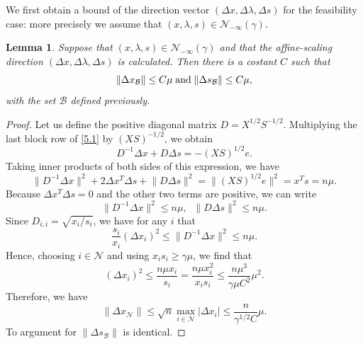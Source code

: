 \documentclass[a4paper,10 pt,titlepage,twoside]{book}
\theoremstyle{plain}
\newtheorem{lem}[thm]{Lemma}
\theoremstyle{definition}
\theoremstyle{remark}
\begin{document}
 We first obtain a bound of the direction vector $(\Delta x,\Delta \lambda, \Delta s)$ for the feasibility case: more precisely we assume that $(x, \lambda, s)\in\mathcal{N}_{- \infty}(\gamma)$.
\begin{lem}
Suppose that $(x, \lambda, s)\in\mathcal{N}_{- \infty}(\gamma)$ and that the affine-scaling direction $(\Delta x,\Delta \lambda, \Delta s)$ is calculated. Then there is a costant $C$ such that
\begin{equation*}
	\lVert \Delta x_{\mathcal{B}} \rVert \leq C \mu \text{\;and\;} \lVert \Delta s_\mathcal{B} \rVert \leq C \mu,
\end{equation*}
with the set $\mathcal{B}$ defined previously. 
\end{lem}
\begin{proof}
	Let us define the positive diagonal matrix $D = X^{1/2}S^{-1/2}$. Multiplying the last block row of \ref{5.1} by $(XS)^{-1/2}$, we obtain 
	\begin{equation*}
	D^{-1}\Delta x + D \Delta s = -(XS)^{1/2}e.
	\end{equation*}
	Taking inner products of both sides of this expression, we have
		\begin{equation*}
	\lVert D^{-1}\Delta x \rVert^{2} + 2\Delta x^{T}\Delta s+ \lVert D\Delta s \rVert^{2}= \lVert(XS)^{1/2}e\rVert^{2}= x^{T}s= n\mu.
	\end{equation*}
	Because $\Delta x^{T}\Delta s= 0$ and the other two terms are positive, we can write
	\begin{equation*}
	\lVert D^{-1}\Delta x\rVert^{2}\leq n\mu, \;\;\lVert D\Delta s\rVert^{2}\leq n\mu.
	\end{equation*}
	Since $D_{i,i}= \sqrt{x_{i}/s_{i}}$, we have for any $i$ that
	\begin{equation*}
	\frac{s_{i}}{x_{i}}(\Delta x_{i})^{2}\leq\lVert D^{-1}\Delta x\rVert^{2}\leq n\mu.
	\end{equation*}
	Hence, choosing $i\in\mathcal{N}$ and using $x_{i}s_{i}\geq\gamma\mu$, we find that
	\begin{equation*}
	(\Delta x_{i})^{2}\leq\frac{n\mu x_{i}}{s_{i}}=\frac{n\mu x_{i}^{2}}{x_{i}s_{i}}\leq\frac{n\mu^{3}}{\gamma\mu C^{2}}\mu^{2}.
	\end{equation*}
	Therefore, we have 
	\begin{equation*}
	\lVert \Delta x_{\mathcal{N}}\rVert \leq \sqrt{n}\max\limits_{i \in \mathcal{N}}|\Delta x_{i}|\leq\frac{n}{\gamma^{1/2}C}\mu.
	\end{equation*}
	To argument for $\lVert \Delta s_{\mathcal{B}}\rVert$ is identical.
\end{proof}
\end{document}
